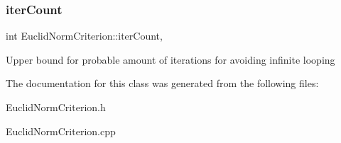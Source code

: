 \subsubsection{\texorpdfstring{iter\+Count}{iterCount}}
{\footnotesize\ttfamily int Euclid\+Norm\+Criterion\+::iter\+Count\hspace{0.3cm}{\ttfamily [mutable]}, {\ttfamily [private]}}

Upper bound for probable amount of iterations for avoiding infinite looping 

The documentation for this class was generated from the following files\+:\begin{DoxyCompactItemize}
\item 
Euclid\+Norm\+Criterion.\+h\item 
Euclid\+Norm\+Criterion.\+cpp\end{DoxyCompactItemize}
